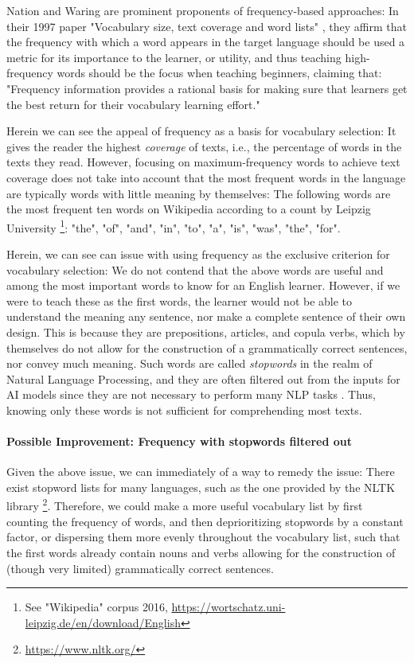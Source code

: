 Nation and Waring are prominent proponents of frequency-based approaches:
In their 1997 paper "Vocabulary size, text coverage and word lists" \cite{nationVocabularySizeText1997}, they affirm that the frequency with which a word appears in the target language should be used a metric for its importance to the learner, or utility, and thus teaching high-frequency words should be the focus when teaching beginners, claiming that:
"Frequency information provides a rational basis for making sure that learners get the best return for their vocabulary learning effort."

Herein we can see the appeal of frequency as a basis for vocabulary selection:
It gives the reader the highest \textit{coverage} of texts, i.e., the percentage of words in the texts they read.
However, focusing on maximum-frequency words to achieve text coverage does not take into account that the most frequent words in the language are typically words with little meaning by themselves: 
The following words are the most frequent ten words on Wikipedia according to a count by Leipzig University \footnote{See "Wikipedia" corpus 2016, \url{https://wortschatz.uni-leipzig.de/en/download/English}}:
"the", "of", "and", "in", "to", "a", "is", "was", "the", "for".

Herein, we can see can issue with using frequency as the exclusive criterion for vocabulary selection:
We do not contend that the above words are useful and among the most important words to know for an English learner.
However, if we were to teach these as the first words, the learner would not be able to understand the meaning any sentence, nor make a complete sentence of their own design.
This is because they are prepositions, articles, and copula verbs, which by themselves do not allow for the construction of a grammatically correct sentences, nor convey much meaning.
Such words are called \textit{stopwords} in the realm of Natural Language Processing, and they are often filtered out from the inputs for AI models since they are not necessary to perform many NLP tasks .
Thus, knowing only these words is not sufficient for comprehending most texts.


\paragraph {Possible Improvement: Frequency with stopwords filtered out}
Given the above issue, we can immediately of a way to remedy the issue:
There exist stopword lists for many languages, such as the one provided by the NLTK library \footnote{\url{https://www.nltk.org/}}.
Therefore, we could make a more useful vocabulary list by first counting the frequency of words, and then deprioritizing stopwords by a constant factor, or dispersing them more evenly throughout the vocabulary list, such that the first words already contain nouns and verbs allowing for the construction of (though very limited) grammatically correct sentences.


